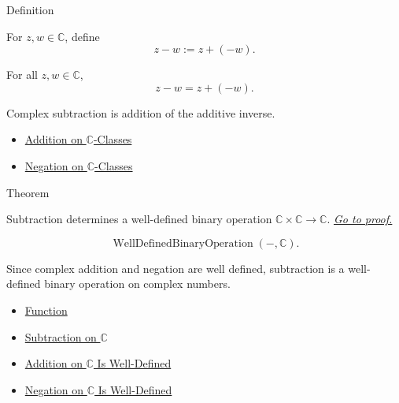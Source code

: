 \begin{definitionbox}{Definition}
\begin{definition}
\label{def:subtraction-on-c}
For $z,w\in\mathbb{C}$, define
\[
z-w:=z+(-w).
\]
\end{definition}
\end{definitionbox}


\begin{remark*}
For all $z,w\in\mathbb{C}$,
\[
z-w=z+(-w).
\]
\end{remark*}

\begin{remark*}[Interpretation]
Complex subtraction is addition of the additive inverse.
\end{remark*}

\begin{dependencies}
\begin{itemize}
  \item \hyperref[def:addition-on-c-classes]{Addition on $\mathbb{C}$-Classes}
  \item \hyperref[def:negation-on-c-classes]{Negation on $\mathbb{C}$-Classes}
\end{itemize}
\end{dependencies}

\begin{theorembox}{Theorem}
\begin{theorem}
\label{thm:subtraction-on-c-well-defined}
Subtraction determines a well-defined binary operation
\(\mathbb{C}\times\mathbb{C}\to\mathbb{C}\).
\hyperref[prf:subtraction-on-c-well-defined]{\textit{Go to proof.}}
\end{theorem}
\end{theorembox}

\begin{remark*}
\[
\operatorname{WellDefinedBinaryOperation}(-,\mathbb{C}).
\]
\end{remark*}

\begin{remark*}[Interpretation]
Since complex addition and negation are well defined, subtraction is a
well-defined binary operation on complex numbers.
\end{remark*}

\begin{dependencies}
\begin{itemize}
  \item \hyperref[def:function]{Function}
  \item \hyperref[def:subtraction-on-c]{Subtraction on $\mathbb{C}$}
  \item \hyperref[thm:addition-on-c-well-defined]{Addition on $\mathbb{C}$ Is Well-Defined}
  \item \hyperref[thm:negation-on-c-well-defined]{Negation on $\mathbb{C}$ Is Well-Defined}
\end{itemize}
\end{dependencies}

